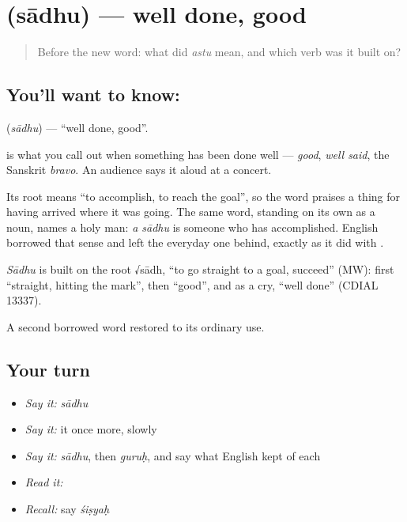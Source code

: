 \section[\texorpdfstring{\sk{साधु} (sādhu)}{साधु (sādhu)}]{ (sādhu) — well done, good}

\label{lesson:SA-C27-well-done}



\begin{quote}
Before the new word: what did \emph{astu} mean, and which verb was it built on?
\end{quote}

\subsection*{You'll want to know: }
\textbf{} (\emph{sādhu}) — \textquotedblleft{}well done, good\textquotedblright{}.

\textbf{} is what you call out when something has been done well — \emph{good}, \emph{well said}, the Sanskrit \emph{bravo}. An audience says it aloud at a concert.

Its root means \textquotedblleft{}to accomplish, to reach the goal\textquotedblright{}, so the word praises a thing for having arrived where it was going. The same word, standing on its own as a noun, names a holy man: \emph{a sādhu} is someone who has accomplished. English borrowed that sense and left the everyday one behind, exactly as it did with .

\begin{cousinweb}
\emph{Sādhu} is built on the root √sādh, \textquotedblleft{}to go straight to a goal, succeed\textquotedblright{} (MW): first \textquotedblleft{}straight, hitting the mark\textquotedblright{}, then \textquotedblleft{}good\textquotedblright{}, and as a cry, \textquotedblleft{}well done\textquotedblright{} (CDIAL 13337).
\end{cousinweb}

\begin{grammarlens}[title={What you've built}]
A second borrowed word restored to its ordinary use.
\end{grammarlens}

\subsection*{Your turn}
\begin{itemize}
\raggedright
  \item \emph{Say it:} \emph{sādhu}
  \item \emph{Say it:} it once more, slowly
  \item \emph{Say it:} \emph{sādhu}, then \emph{guruḥ}, and say what English kept of each
  \item \emph{Read it:} \textbf{}
  \item \emph{Recall:} say \emph{śiṣyaḥ}
\end{itemize}

